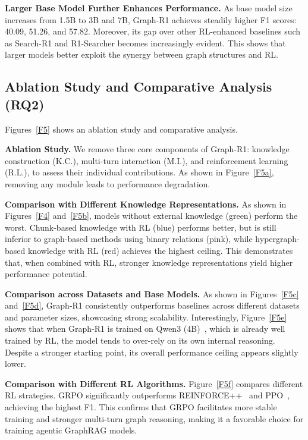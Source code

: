 \documentclass{article}
\theoremstyle{plain}
\theoremstyle{definition}
\theoremstyle{remark}
\begin{document}
\textbf{Larger Base Model Further Enhances Performance. }
As base model size increases from 1.5B to 3B and 7B, Graph-R1 achieves steadily higher F1 scores: 40.09, 51.26, and 57.82. Moreover, its gap over other RL-enhanced baselines such as Search-R1 and R1-Searcher becomes increasingly evident. This shows that larger models better exploit the synergy between graph structures and RL.

\subsection{Ablation Study and Comparative Analysis (RQ2)}
Figures~\ref{F5} shows an ablation study and comparative analysis.

\textbf{Ablation Study.}
We remove three core components of Graph-R1: knowledge construction (K.C.), multi-turn interaction (M.I.), and reinforcement learning (R.L.), to assess their individual contributions. As shown in Figure~\ref{F5a}, removing any module leads to performance degradation.

\textbf{Comparison with Different Knowledge Representations.}
As shown in Figures~\ref{F4} and~\ref{F5b}, models without external knowledge (green) perform the worst. Chunk-based knowledge with RL (blue) performs better, but is still inferior to graph-based methods using binary relations (pink), while hypergraph-based knowledge with RL (red) achieves the highest ceiling. This demonstrates that, when combined with RL, stronger knowledge representations yield higher performance potential.


\textbf{Comparison across Datasets and Base Models.}
As shown in Figures~\ref{F5c} and~\ref{F5d}, Graph-R1 consistently outperforms baselines across different datasets and parameter sizes, showcasing strong scalability. Interestingly, Figure~\ref{F5e} shows that when Graph-R1 is trained on Qwen3 (4B)~\citep{Qwen3}, which is already well trained by RL, the model tends to over-rely on its own internal reasoning. Despite a stronger starting point, its overall performance ceiling appears slightly lower.

\textbf{Comparison with Different RL Algorithms.}
Figure~\ref{F5f} compares different RL strategies. GRPO significantly outperforms REINFORCE++~\citep{RPP} and PPO~\citep{PPO}, achieving the highest F1. This confirms that GRPO facilitates more stable training and stronger multi-turn graph reasoning, making it a favorable choice for training agentic GraphRAG models. 
\end{document}
